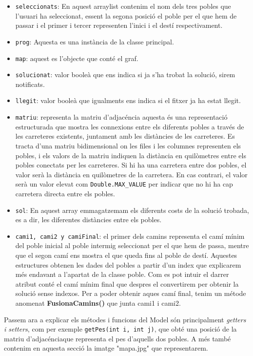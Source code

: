 \documentclass[conference]{IEEEtran}
\begin{document}
    \begin{itemize}
        \item \texttt{seleccionats}: En aquest arraylist contenim el nom dels tres pobles que l'usuari ha seleccionat, essent la segona posició el poble per el que hem de passar i el primer i tercer representen l'inici i el destí respectivament.\\
        \item \texttt{prog}: Aquesta es una instància de la classe principal.\\
        \item \texttt{map}: aquest es l'objecte que conté el graf.\\
        \item \texttt{solucionat}: valor booleà que ens indica si ja s'ha trobat la solució, sirem notificats.\\
        \item \texttt{llegit}: valor booleà que igualments ens indica si el fitxer ja ha estat llegit.\\
        \item \texttt{matriu}: representa la matriu d'adjacéncia aquesta és una representació estructurada que mostra les connexions entre els diferents pobles a través de les carreteres existents, juntament amb les distàncies de les carreteres. Es tracta d'una matriu bidimensional on les files i les columnes representen els pobles, i els valors de la matriu indiquen la distància en quilòmetres entre els pobles conectats per les carreteres. Si hi ha una carretera entre dos pobles, el valor serà la distància en quilòmetres de la carretera. En cas contrari, el valor serà un valor elevat com \texttt{Double.MAX\_VALUE} per indicar que no hi ha cap carretera directa entre els pobles.\\
        \item \texttt{sol}: En aquest array emmagatzemam els diferents costs de la solució trobada, es a dir, les diferentes distàncies entre els pobles.\\
        \item \texttt{cami1, cami2 y camiFinal}: el primer dels camins representa el camí mínim del poble inicial al poble intermig seleccionat per el que hem de passa, mentre que el segon camí ens mostra el que queda fins al poble de destí. Aquestes estructures obtenen les dades del pobles a partir d'un index que explicarem més endavant a l'apartat de la classe poble. Com es pot intuir el darrer atribut conté el camí mínim final que despres el convertirem per obtenir la solució sense indexos. Per a poder obtenir aques camí final, tenim un métode anomenat \textbf{FusionaCamins()} que junta cami1 i cami2.\\
    \end{itemize}
    Passem ara a explicar els métodes i funcions del Model són principalment \textit{getters i setters}, com per exemple \texttt{getPes(int i, int j)}, que obté una posició de la matriu d'adjacénciaque representa el pes d'aquells dos pobles.
    A més també contenim en aquesta secció la imatge "mapa.jpg" que representarem.
\end{document}
